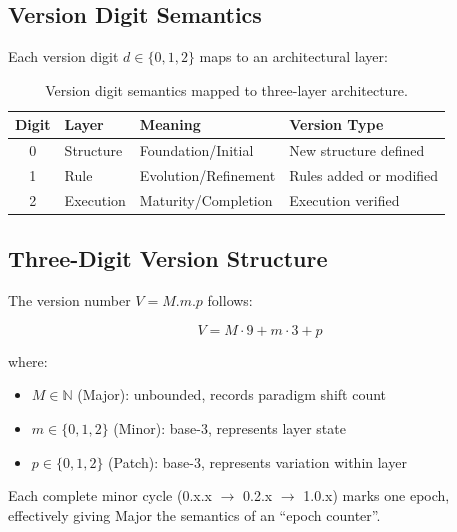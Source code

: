 \documentclass{article}
\begin{document}
\subsection{Version Digit Semantics}

Each version digit $d \in \{0, 1, 2\}$ maps to an architectural layer:

\begin{table}[h]
\centering
\caption{Version digit semantics mapped to three-layer architecture.}
\label{tab:digit-semantics}
\begin{tabular}{clll}
\toprule
\textbf{Digit} & \textbf{Layer} & \textbf{Meaning} & \textbf{Version Type} \\
\midrule
0 & Structure & Foundation/Initial & New structure defined \\
1 & Rule & Evolution/Refinement & Rules added or modified \\
2 & Execution & Maturity/Completion & Execution verified \\
\bottomrule
\end{tabular}
\end{table}

\subsection{Three-Digit Version Structure}

The version number $V = M.m.p$ follows:

\begin{equation}
\label{eq:version}
V = M \cdot 9 + m \cdot 3 + p
\end{equation}

where:
\begin{itemize}
\item $M \in \mathbb{N}$ (Major): unbounded, records paradigm shift count
\item $m \in \{0, 1, 2\}$ (Minor): base-3, represents layer state
\item $p \in \{0, 1, 2\}$ (Patch): base-3, represents variation within layer
\end{itemize}

Each complete minor cycle (0.x.x $\to$ 0.2.x $\to$ 1.0.x) marks one epoch, effectively giving Major the semantics of an ``epoch counter''.
\end{document}
